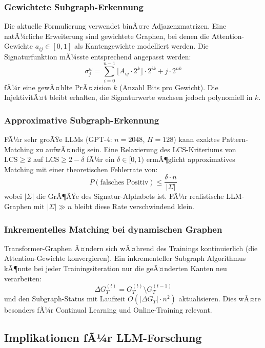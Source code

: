 ﻿\documentclass[a4paper,12pt]{article}
\theoremstyle{definition}
\begin{document}
\subsubsection{Gewichtete Subgraph-Erkennung}

Die aktuelle Formulierung verwendet binÃ¤re Adjazenzmatrizen. Eine natÃ¼rliche
Erweiterung sind gewichtete Graphen, bei denen die Attention-Gewichte
$a_{ij} \in [0,1]$ als Kantengewichte modelliert werden. Die Signaturfunktion
mÃ¼sste entsprechend angepasst werden:
\[
\sigma_j^w = \sum_{i=0}^{n-1} \lfloor A_{ij} \cdot 2^k \rfloor \cdot 2^{ik} + j \cdot 2^{nk}
\]
fÃ¼r eine gewÃ¤hlte PrÃ¤zision $k$ (Anzahl Bits pro Gewicht). Die InjektivitÃ¤t
bleibt erhalten, die Signaturwerte wachsen jedoch polynomiell in $k$.

\subsubsection{Approximative Subgraph-Erkennung}

FÃ¼r sehr groÃŸe LLMs (GPT-4: $n = 2048$, $H = 128$) kann exaktes Pattern-Matching
zu aufwÃ¤ndig sein. Eine Relaxierung des LCS-Kriteriums von $\mathrm{LCS} \geq 2$
auf $\mathrm{LCS} \geq 2 - \delta$ fÃ¼r ein $\delta \in [0, 1)$ ermÃ¶glicht
approximatives Matching mit einer theoretischen Fehlerrate von:
\[
P(\text{falsches Positiv}) \leq \frac{\delta \cdot n}{|\Sigma|}
\]
wobei $|\Sigma|$ die GrÃ¶ÃŸe des Signatur-Alphabets ist. FÃ¼r realistische
LLM-Graphen mit $|\Sigma| \gg n$ bleibt diese Rate verschwindend klein.

\subsubsection{Inkrementelles Matching bei dynamischen Graphen}

Transformer-Graphen Ã¤ndern sich wÃ¤hrend des Trainings kontinuierlich
(die Attention-Gewichte konvergieren). Ein inkrementeller Subgraph Algorithmus
kÃ¶nnte bei jeder Trainingsiteration nur die geÃ¤nderten Kanten neu verarbeiten:
\[
\Delta G_T^{(t)} = G_T^{(t)} \setminus G_T^{(t-1)}
\]
und den Subgraph-Status mit Laufzeit $O(|\Delta G_T| \cdot n^2)$ aktualisieren.
Dies wÃ¤re besonders fÃ¼r Continual Learning und Online-Training relevant.

\subsection{Implikationen fÃ¼r LLM-Forschung}
\end{document}
